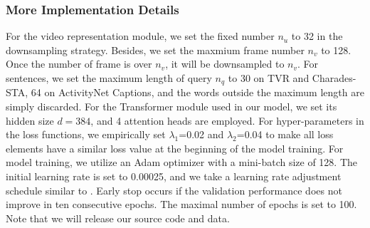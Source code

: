 \documentclass[sigconf]{acmart}
\begin{document}
\subsubsection{More Implementation Details}\label{sec:details}
For the video representation module, we set the fixed number $n_u$ to 32 in the downsampling strategy.
Besides, we set the maxmium frame number $n_v$ to 128. Once the number of frame is over $n_v$, it will be downsampled to $n_v$.
For sentences, we set the maximum length of query $n_q$ to 30 on TVR and Charades-STA, 64 on ActivityNet Captions, and the words outside the maximum length are simply discarded.
For the Transformer module used in our model, we set its hidden size $d=384$, and 4 attention heads are employed.
For hyper-parameters in the loss functions, we empirically set $\lambda_{1}$=0.02 and $\lambda_{2}$=0.04 to make all loss elements have a similar loss value at the beginning of the model training.
For model training, we utilize an Adam optimizer with a mini-batch size of 128. 
The initial learning rate is set to 0.00025, and we take a learning rate adjustment schedule similar to \cite{lei2020tvr}. 
Early stop occurs if the validation performance does not improve in ten consecutive epochs. The maximal number of epochs is set to 100. Note that we will release our source code and data.
\end{document}
